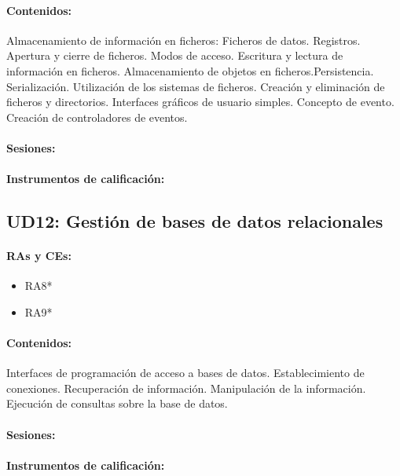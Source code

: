 	\paragraph{Contenidos:}
		Almacenamiento de información en ficheros: Ficheros de datos. Registros. Apertura y cierre de ficheros. Modos de acceso. Escritura y lectura de información en ficheros. Almacenamiento de objetos en ficheros.Persistencia. Serialización. Utilización de los sistemas de ficheros. Creación y eliminación de ficheros y directorios.
		Interfaces gráficos de usuario simples. Concepto de evento. Creación de controladores de eventos.

	\paragraph{Sesiones:}
	\paragraph{Instrumentos de calificación:}


\newpage
\subsection{UD12: Gestión de bases de datos relacionales}

	\paragraph{RAs y CEs:}
	\begin{itemize}[itemsep=0.1em, topsep=0.1em]
		\item RA8*
		\item RA9*
	\end{itemize}

	\paragraph{Contenidos:}
		
		Interfaces de programación de acceso a bases de datos.
		Establecimiento de conexiones.
		Recuperación de información.
		Manipulación de la información.
		Ejecución de consultas sobre la base de datos.

	\paragraph{Sesiones:}
	\paragraph{Instrumentos de calificación:}



